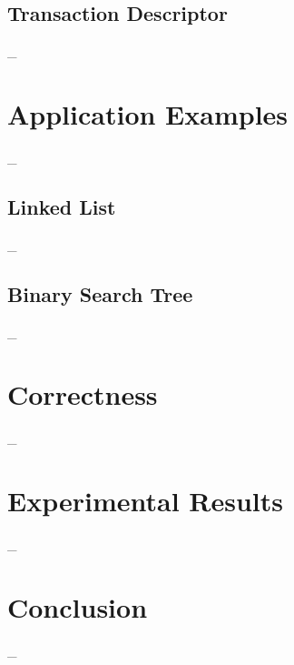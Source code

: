 \documentclass[10pt,conference,compsocconf]{IEEEtran}
\begin{document}

\subsection{Transaction Descriptor}
\label{sec:txndesc}
\_

\section{Application Examples}
\label{sec:application}
\_

\subsection{Linked List}
\_

\subsection{Binary Search Tree}
\_

\section{Correctness}
\label{sec:correctness}
\_

\section{Experimental Results}
\label{sec:experiment}
\_

\section{Conclusion}
\label{sec:conclusion}
\_




\end{document}
